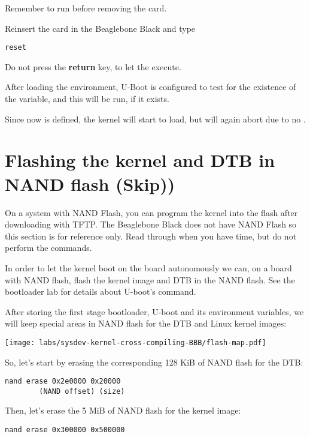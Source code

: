 Remember to run  before removing the card.

Reinsert the card in the Beaglebone Black and type

\begin{verbatim}
reset
\end{verbatim}

Do not press the {\bf return} key, to let the  execute.

After loading the  environment, U-Boot is configured to test for
the existence of the  variable, and this will be run, if it exists.

Since  now is defined, the kernel will start to load, but will again abort due to no .

\clearpage
\section{Flashing the kernel and DTB in NAND flash (Skip))}

On a system with NAND Flash, you can program the kernel into the flash
after downloading with TFTP. The Beaglebone Black does not have NAND Flash
so this section is for reference only. Read through when you have time, 
but do not perform the commands.

In order to let the kernel boot on the board autonomously we can,
on a board with NAND flash, flash the kernel image and DTB in the NAND flash. 
See the bootloader lab for details about U-boot's  command.

After storing the first stage bootloader, U-boot and its environment
variables, we will keep special areas in NAND flash for the DTB
and Linux kernel images:

\begin{center}
  \texttt{[image: labs/sysdev-kernel-cross-compiling-BBB/flash-map.pdf]}
\end{center}

So, let's start by erasing the corresponding 128 KiB of NAND flash
for the DTB:

\begin{verbatim}
nand erase 0x2e0000 0x20000
        (NAND offset) (size)
\end{verbatim}

Then, let's erase the 5 MiB of NAND flash for the kernel image:

\begin{verbatim}
nand erase 0x300000 0x500000
\end{verbatim}

